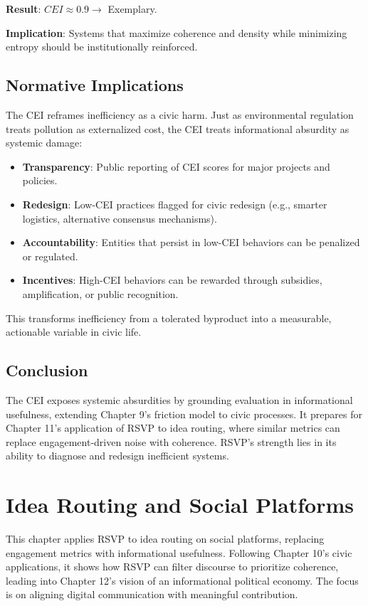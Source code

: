 \documentclass[openany]{book}
\begin{document}
\textbf{Result}: $CEI \approx 0.9 \rightarrow$ Exemplary.

\textbf{Implication}: Systems that maximize coherence and density while minimizing entropy should be institutionally reinforced.

\section{Normative Implications}

The CEI reframes inefficiency as a civic harm. Just as environmental regulation treats pollution as externalized cost, the CEI treats informational absurdity as systemic damage:

\begin{itemize}
    \item \textbf{Transparency}: Public reporting of CEI scores for major projects and policies.
    \item \textbf{Redesign}: Low-CEI practices flagged for civic redesign (e.g., smarter logistics, alternative consensus mechanisms).
    \item \textbf{Accountability}: Entities that persist in low-CEI behaviors can be penalized or regulated.
    \item \textbf{Incentives}: High-CEI behaviors can be rewarded through subsidies, amplification, or public recognition.
\end{itemize}

This transforms inefficiency from a tolerated byproduct into a measurable, actionable variable in civic life.

\section{Conclusion}

The CEI exposes systemic absurdities by grounding evaluation in informational usefulness, extending Chapter 9’s friction model to civic processes. It prepares for Chapter 11’s application of RSVP to idea routing, where similar metrics can replace engagement-driven noise with coherence. RSVP’s strength lies in its ability to diagnose and redesign inefficient systems.

\chapter{Idea Routing and Social Platforms}

This chapter applies RSVP to idea routing on social platforms, replacing engagement metrics with informational usefulness. Following Chapter 10’s civic applications, it shows how RSVP can filter discourse to prioritize coherence, leading into Chapter 12’s vision of an informational political economy. The focus is on aligning digital communication with meaningful contribution.
\end{document}
